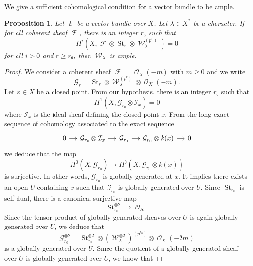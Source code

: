 \documentclass[11pt]{amsart}
\numberwithin{subsection}{section}
\numberwithin{figure}{section}
\numberwithin{table}{section}
\theoremstyle{1}
\newtheorem{proposition}[theorem]{Proposition}
\theoremstyle{2}
\DeclareMathOperator{\St}{St}
\DeclareMathOperator{\Fc}{\mathcal{F}}
\DeclareMathOperator{\E}{\mathcal{E}}
\DeclareMathOperator{\Oc}{\mathcal{O}}
\DeclareMathOperator{\W}{\mathcal{W}}
\begin{document}
We give a sufficient cohomological condition for a vector bundle to be ample. 
\begin{proposition}\label{prop2}
Let $\E$ be a vector bundle over $X$. Let $\lambda \in X^*$ be a character. If for all coherent sheaf $\Fc$, there is an integer $r_0$ such that
\begin{equation*}
H^i(X,\Fc \otimes \St_r \otimes \W_{\lambda}^{(p^r)}) = 0
\end{equation*}
for all $i>0$ and $r \geq r_0$, then $\W_{\lambda}$ is ample.
\end{proposition}
\begin{proof}
We consider a coherent sheaf $\Fc = \Oc_X(-m)$ with $m\geq 0$ and we write $$\mathcal{G}_r = \St_r\otimes \W_{\lambda}^{(p^r)} \otimes \Oc_X(-m).$$Let $x \in X$ be a closed point. From our hypothesis, there is an integer $r_0$ such that 
\begin{equation*}
H^1(X, \mathcal{G}_{r_0} \otimes \mathcal{I}_x) = 0
\end{equation*}
where $\mathcal{I}_x$ is the ideal sheaf defining the closed point $x$. From the long exact sequence of cohomology associated to the exact sequence 
\begin{equation*}
\begin{tikzcd}[column sep = small]
0 \arrow[r] & \mathcal{G}_{r_0}\otimes \mathcal{I}_x \arrow[r] & \mathcal{G}_{r_0} \arrow[r] & \mathcal{G}_{r_0} \otimes k(x) \arrow[r] & 0
\end{tikzcd}
\end{equation*}
we deduce that the map
\begin{equation*}
H^0(X,\mathcal{G}_{r_0}) \rightarrow H^0(X,\mathcal{G}_{r_0}\otimes k(x))
\end{equation*}
is surjective. In other words, $\mathcal{G}_{r_0}$ is globally generated at $x$. It implies there exists an open $U$ containing $x$ such that $\mathcal{G}_{r_0}$ is globally generated over $U$. Since $\St_{r_0}$ is self dual, there is a canonical surjective map
\begin{equation*}
\St_{r_0}^{\otimes 2} \rightarrow \Oc_X.
\end{equation*}
Since the tensor product of globally generated sheaves over $U$ is again globally generated over $U$, we deduce that 
\begin{equation*}
\mathcal{G}_{r_0}^{\otimes 2} = \St_{r_0}^{\otimes 2} \otimes {(\W_{\lambda}^{\otimes 2})}^{(p^{r_0})} \otimes \Oc_X(-2m)
\end{equation*}
is a globally generated over $U$. Since the quotient of a globally generated sheaf over $U$ is globally generated over $U$, we know that

\end{proof}
\end{document}
